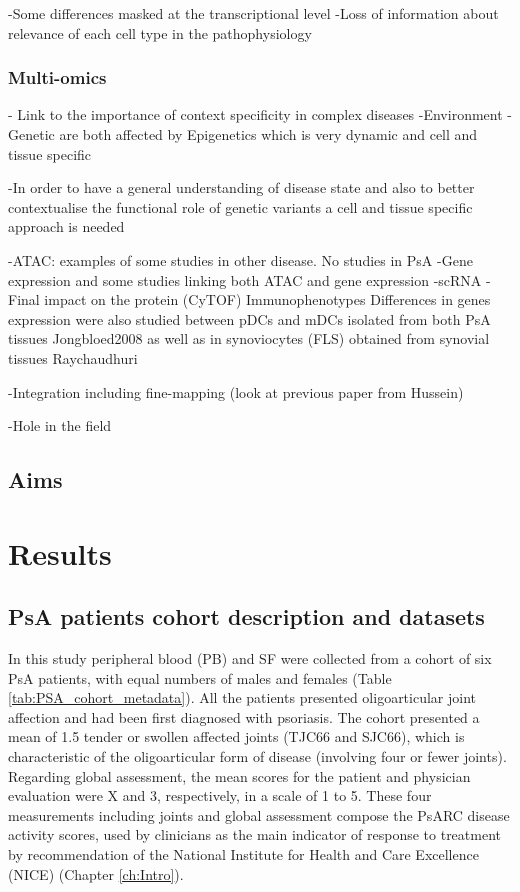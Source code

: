 -Some differences masked at the transcriptional level
-Loss of information about relevance of each cell type in the pathophysiology



\subsubsection{Multi-omics}
- Link to the importance of context specificity in complex diseases 
	-Environment
	-Genetic
	are both affected by Epigenetics which is very dynamic and cell and tissue specific
	
	-In order to have a general understanding of disease state and also to better contextualise the functional role of genetic variants a cell and tissue specific approach is needed
	
	-ATAC: examples of some studies in other disease. No studies in PsA
	-Gene expression and some studies linking both ATAC and gene expression
	-scRNA 
	-Final impact on the protein (CyTOF)
	Immunophenotypes
Differences in genes expression were also studied between pDCs and mDCs isolated from both PsA tissues
Jongbloed2008
as well as in synoviocytes (FLS) obtained from synovial tissues Raychaudhuri
	
	-Integration including fine-mapping (look at previous paper from Hussein)
	
	-Hole in the field
	
	
	\subsection{Aims}











\section{Results}
%

\subsection{PsA patients cohort description and datasets}
In this study peripheral blood (PB) and SF were collected from a cohort of six PsA patients, with equal numbers of males and females (Table \ref{tab:PSA_cohort_metadata}). All the patients presented oligoarticular joint affection and had been first diagnosed with psoriasis. The cohort presented a mean of 1.5 tender or swollen affected joints (TJC66 and SJC66), which is characteristic of the oligoarticular form of disease (involving four or fewer joints). Regarding global assessment, the mean scores for the patient and physician evaluation were X and 3, respectively, in a scale of 1 to 5. These four measurements including joints and global assessment compose the PsARC disease activity scores, used by clinicians as the main indicator of response to treatment by recommendation of the National Institute for Health and Care Excellence (NICE) (Chapter \ref{ch:Intro}). 

